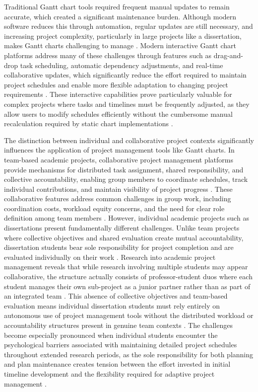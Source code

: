 \documentclass[12pt,nonacm,acmlarge,titlepage,screen]{acmart}
\begin{document}
Traditional Gantt chart tools required frequent manual updates to remain accurate, which created a significant maintenance burden. Although modern software reduces this through automation, regular updates are still necessary, and increasing project complexity, particularly in large projects like a dissertation, makes Gantt charts challenging to manage \cite{atlassian_gantt_2025}. Modern interactive Gantt chart platforms address many of these challenges through features such as drag-and-drop task scheduling, automatic dependency adjustments, and real-time collaborative updates, which significantly reduce the effort required to maintain project schedules and enable more flexible adaptation to changing project requirements \cite{teamhub_interactive_gantt_2023}. These interactive capabilities prove particularly valuable for complex projects where tasks and timelines must be frequently adjusted, as they allow users to modify schedules efficiently without the cumbersome manual recalculation required by static chart implementations \cite{teamhub_interactive_gantt_2023}.

The distinction between individual and collaborative project contexts significantly influences the application of project management tools like Gantt charts. In team-based academic projects, collaborative project management platforms provide mechanisms for distributed task assignment, shared responsibility, and collective accountability, enabling group members to coordinate schedules, track individual contributions, and maintain visibility of project progress \cite{hassen_use_2024}. These collaborative features address common challenges in group work, including coordination costs, workload equity concerns, and the need for clear role definition among team members \cite{hassen_use_2024}. However, individual academic projects such as dissertations present fundamentally different challenges. Unlike team projects where collective objectives and shared evaluation create mutual accountability, dissertation students bear sole responsibility for project completion and are evaluated individually on their work \cite{riol_thuillier_2015}. Research into academic project management reveals that while research involving multiple students may appear collaborative, the structure actually consists of professor-student duos where each student manages their own sub-project as a junior partner rather than as part of an integrated team \cite{riol_thuillier_2015}. This absence of collective objectives and team-based evaluation means individual dissertation students must rely entirely on autonomous use of project management tools without the distributed workload or accountability structures present in genuine team contexts \cite{besner_2008}. The challenges become especially pronounced when individual students encounter the psychological barriers associated with maintaining detailed project schedules throughout extended research periods, as the sole responsibility for both planning and plan maintenance creates tension between the effort invested in initial timeline development and the flexibility required for adaptive project management \cite{academiac_gantt_phd_2018}.
\end{document}
